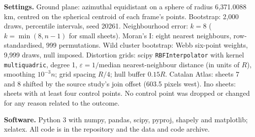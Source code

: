 \documentclass[11pt,a4paper]{article}
\begin{document}
\textbf{Settings.} Ground plane: azimuthal equidistant on a sphere of radius 6,371.0088 km, centred on the spherical centroid of each frame's points. Bootstrap: 2,000 draws, percentile intervals, seed 20261. Neighbourhood error: $k = 8$ ($k = \min(8, n-1)$ for small sheets). Moran's I: eight nearest neighbours, row-standardised, 999 permutations. Wild cluster bootstrap: Webb six-point weights, 9,999 draws, null imposed. Distortion grids: scipy \texttt{RBFInterpolator} with kernel \texttt{multiquadric}, degree 1, $\varepsilon = 1/$median nearest-neighbour distance (in units of $R$), smoothing $10^{-3} n$; grid spacing $R/4$; hull buffer $0.15R$. Catalan Atlas: sheets 7 and 8 shifted by the source study's join offset (603.5 pixels west). Ino sheets: sheets with at least four control points. No control point was dropped or changed for any reason related to the outcome.

\textbf{Software.} Python 3 with numpy, pandas, scipy, pyproj, shapely and matplotlib; xelatex. All code is in the repository and the data and code archive.
\end{document}
